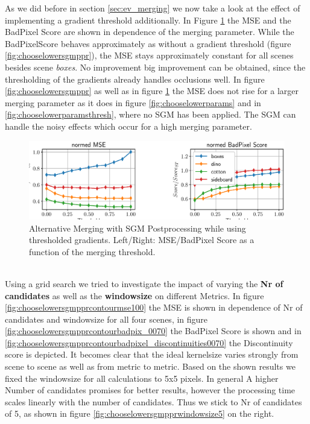 \documentclass  [
  paper    = a4,
  BCOR     = 10mm,
  twoside,
  fontsize = 12pt,
  fleqn,
  toc      = bibnumbered,
  toc      = listofnumbered,
  numbers  = noendperiod,
  headings = normal,
  listof   = leveldown,
  version  = 3.03
]                                       {scrreprt}
\begin{document}
As we did before in section \ref{sec:ev_merging} we now take a look at the effect of implementing a gradient threshold additionally. In Figure \ref{fig:chooselowersgmpprthresh} the MSE and the BadPixel Score are shown in dependence of the merging parameter. While the BadPixelScore behaves approximately as without a gradient threshold (figure \ref{fig:chooselowersgmppr}), the MSE stays approximately constant for all scenes besides scene \textit{boxes}. No improvement big improvement can be obtained, since the thresholding of the gradients already handles occlusions well. 
In figure \ref{fig:chooselowersgmppr} as well as in figure \ref{fig:chooselowersgmpprthresh} the MSE does not rise for a larger merging parameter as it does in figure \ref{fig:chooselowerparams} and in \ref{fig:chooselowerparamsthresh}, where no SGM has been applied. The SGM can handle the noisy effects which occur for a high merging parameter.
\begin{figure}
	\centering
	\includegraphics[width=1\linewidth]{images/choose_lower_sgm_ppr_thresh}
	\caption[Alternative Merging with SGM Postprocessing with thresholded gradients]{Alternative Merging with SGM Postprocessing while using thresholded gradients. Left/Right: MSE/BadPixel Score as a function of the merging threshold.}
	\label{fig:chooselowersgmpprthresh}
\end{figure}
\ \\
Using a grid search we tried to investigate the impact of varying the \textbf{Nr of candidates} as well as the \textbf{windowsize} on different Metrics. In figure \ref{fig:chooselowersgmpprcontourmse100} the MSE is shown in dependence of Nr of candidates and windowsize for all four scenes, in figure \ref{fig:chooselowersgmpprcontourbadpix_0070} the BadPixel Score is shown and in \ref{fig:chooselowersgmpprcontourbadpixel_discontinuities0070} the Discontinuity score is depicted. It becomes clear that the ideal kernelsize varies strongly from scene to scene as well as from metric to metric. Based on the shown results we fixed the windowsize for all calculations to 5x5 pixels. In general A higher Number of candidates promises for better results, however the processing time scales linearly with the number of candidates. Thus we stick to Nr of candidates of 5, as shown in figure \ref{fig:chooselowersgmpprwindowsize5} on the right.
\end{document}
